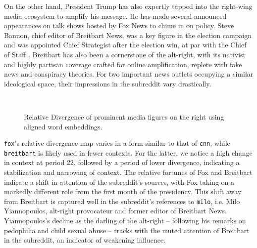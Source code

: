 On the other hand, President Trump has also expertly tapped into the right-wing media ecosystem to amplify his message. He has made several announced appearances on talk shows hosted by Fox News to chime in on policy. Steve Bannon, chief editor of Breitbart News, was a key figure in the election campaign and was appointed Chief Strategist after the election win, at par with the Chief of Staff \citep{noauthor_donald_2016}. Breitbart has also been a cornerstone of the alt-right, with its nativist and highly partisan coverage crafted for online amplification, replete with fake news and conspiracy theories. For two important news outlets occupying a similar ideological space, their impressions in the subreddit vary drastically. 

\begin{figure}[h!]%

    \centering

     ~
    
    \caption{Relative Divergence of prominent media figures on the right using aligned word embeddings.}%

    \label{fig:div_milo}%

\end{figure}

\texttt{fox}'s relative divergence map varies in a form similar to that of \texttt{cnn}, while \texttt{breitbart} is likely used in fewer contexts. For the latter, we notice a high change in context at period 22, followed by a period of lower divergence, indicating a stabilization and narrowing of context. The relative fortunes of Fox and Breitbart indicate a shift in attention of the subreddit's sources, with Fox taking on a markedly different role from the first month of the presidency. This shift away from Breitbart is captured well in the subreddit's references to \texttt{milo}, i.e. Milo Yiannopoulos, alt-right provocateur and former editor of Breitbart News. Yiannopoulos's decline as the darling of the alt-right -- following his remarks on pedophilia and child sexual abuse -- tracks with the muted attention of Breitbart in the subreddit, an indicator of weakening influence. 

